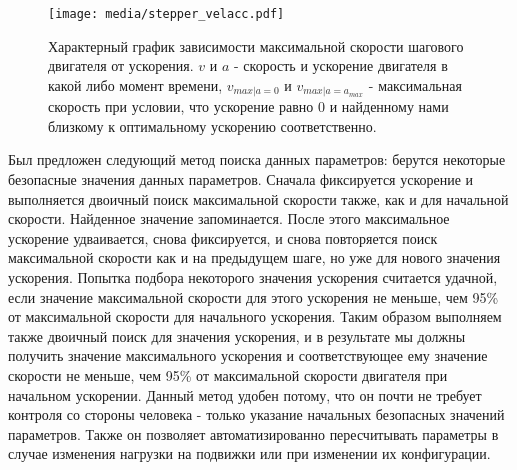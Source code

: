 \documentclass[14pt,russian,a4paper]{extarticle}
\begin{document}
\begin{figure}[h!]
    \centerline{\texttt{[image: media/stepper\_velacc.pdf]}}
    \caption{Характерный график зависимости максимальной скорости шагового двигателя от ускорения. $v$ и $a$ - скорость и ускорение двигателя в какой либо момент времени, $v_{max | a=0}$ и $v_{max | a=a_{max}}$ - максимальная скорость при условии, что ускорение равно 0 и найденному нами близкому к оптимальному ускорению соответственно.}
    \label{fig:stepper_velacc}
\end{figure}

Был предложен следующий метод поиска данных параметров: берутся некоторые безопасные значения данных параметров. Сначала фиксируется ускорение и выполняется двоичный поиск максимальной скорости также, как и для начальной скорости. Найденное значение запоминается. После этого максимальное ускорение удваивается, снова фиксируется, и снова повторяется поиск максимальной скорости как и на предыдущем шаге, но уже для нового значения ускорения. Попытка подбора некоторого значения ускорения считается удачной, если значение максимальной скорости для этого ускорения не меньше, чем 95\% от максимальной скорости для начального ускорения. Таким образом выполняем также двоичный поиск для значения ускорения, и в результате мы должны получить значение максимального ускорения и соответствующее ему значение скорости не меньше, чем 95\% от максимальной скорости двигателя при начальном ускорении. Данный метод удобен потому, что он почти не требует контроля со стороны человека - только указание начальных безопасных значений параметров. Также он позволяет автоматизированно пересчитывать параметры в случае изменения нагрузки на подвижки или при изменении их конфигурации.

\newpage
\end{document}

